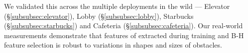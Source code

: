 
We validated this across the multiple deployments in the wild --- Elevator (\S\ref{subsubsec:elevator}), Lobby (\S\ref{subsubsec:lobby}), Starbucks (\S\ref{subsubsec:starbucks}) and Cafeteria (\S\ref{subsubsec:cafeteria}).
%
%
Our real-world measurements demonstrate that features of \aout extracted during training and B-H feature selection is robust to variations in shapes and sizes of obstacles.


